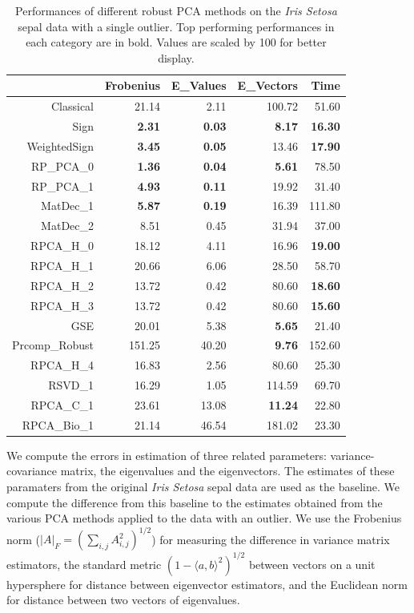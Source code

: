 \documentclass[ss]{imsart}
\theoremstyle{Example}
\newcommand{\attention}[1]{{\color{red}{\textbf{[ATTENTION:#1]}}}}
\begin{document}
\begin{table}[ht]
\centering
\begin{tabular}{rrrrr}
  \hline
 & Frobenius & E\_Values & E\_Vectors & Time \\ 
  \hline
Classical & 21.14 & 2.11 & 100.72 & 51.60 \\ 
  Sign & \textbf{2.31} & \textbf{0.03} & \textbf{8.17} & \textbf{16.30} \\ 
  WeightedSign & \textbf{3.45} & \textbf{0.05} & \textrm{13.46} & \textbf{17.90} \\ 
  RP\_PCA\_0 & \textbf{1.36} & \textbf{0.04} & \textbf{5.61} & 78.50 \\ 
  RP\_PCA\_1 & \textbf{4.93} & \textbf{0.11} & 19.92 & 31.40 \\ 
  MatDec\_1 & \textbf{5.87} & \textbf{0.19} & 16.39 & 111.80 \\ 
  MatDec\_2 & 8.51 & 0.45 & 31.94 & 37.00 \\ 
  RPCA\_H\_0 & 18.12 & 4.11 & 16.96 & \textbf{19.00} \\ 
  RPCA\_H\_1 & 20.66 & 6.06 & 28.50 & 58.70 \\ 
  RPCA\_H\_2 & 13.72 & 0.42 & 80.60 & \textbf{18.60} \\ 
  RPCA\_H\_3 & 13.72 & 0.42 & 80.60 & \textbf{15.60} \\ 
  		GSE & 20.01 & 5.38 & \textbf{5.65} & 21.40 \\ 
  Prcomp\_Robust & 151.25 & 40.20 & \textbf{9.76} & 152.60 \\ 
  RPCA\_H\_4 & 16.83 & 2.56 & 80.60 & 25.30 \\ 
  RSVD\_1 & 16.29 & 1.05 & 114.59 & 69.70 \\ 
  RPCA\_C\_1 & 23.61 & 13.08 & \textbf{11.24} & 22.80 \\ 
  RPCA\_Bio\_1 & 21.14 & 46.54 & 181.02 & 23.30 \\ 
   \hline
\end{tabular}
\caption{Performances of different robust PCA methods on the \textit{Iris Setosa} sepal data with a single outlier. Top performing performances in each category are in bold. Values are scaled by 100 for better display.}
\attention{Time in what units? }
\label{Table:1}
\end{table}


We compute the errors in estimation of three related parameters:  variance-covariance matrix, the eigenvalues and the eigenvectors. The estimates of these paramaters from the original \textit{Iris Setosa} sepal data are used as the baseline. We compute the difference from this baseline to the estimates obtained from the various PCA methods applied to the data with an outlier. We use the Frobenius norm ($|A|_{F} = (\sum_{i, j} A_{i, j}^{2})^{1/2}$) for measuring the difference in variance matrix estimators, the standard metric  $ (1 - \langle a, b \rangle^{2} )^{1/2}$ between vectors on a unit hypersphere for distance between eigenvector estimators, and the Euclidean norm for distance between two vectors of eigenvalues. 
\end{document}
